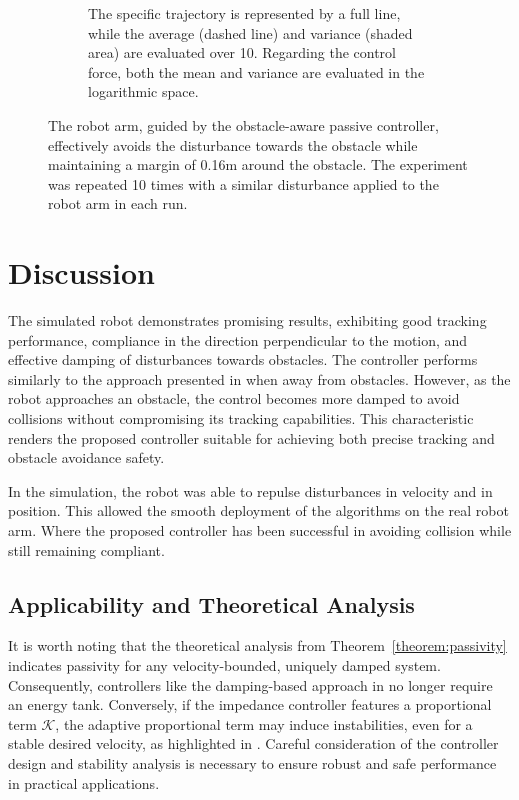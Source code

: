\begin{figure}
\begin{subfigure}{\columnwidth}
      \caption{The specific trajectory is represented by a full line, while the average (dashed line) and variance (shaded area) are evaluated over 10.  Regarding the control force, both the mean and variance are evaluated in the logarithmic space.}
      \label{fig:trajectory_comparison_force_and_distance}
    \end{subfigure}
	\caption{
The robot arm, guided by the obstacle-aware passive controller, effectively avoids the disturbance towards the obstacle while maintaining a margin of 0.16m around the obstacle. The experiment was repeated 10 times with a similar disturbance applied to the robot arm in each run.
 }  
    \label{fig:evaluation_on_robot_arm}
\end{figure}

\section{Discussion}
The simulated robot demonstrates promising results, exhibiting good tracking performance, compliance in the direction perpendicular to the motion, and effective damping of disturbances towards obstacles. The controller performs similarly to the approach presented in \cite{kronander2015passive} when away from obstacles. However, as the robot approaches an obstacle, the control becomes more damped to avoid collisions without compromising its tracking capabilities. This characteristic renders the proposed controller suitable for achieving both precise tracking and obstacle avoidance safety.

In the simulation, the robot was able to repulse disturbances in velocity and in position. This allowed the smooth deployment of the algorithms on the real robot arm. Where the proposed controller has been successful in avoiding collision while still remaining compliant.

\subsection{Applicability and Theoretical Analysis}
It is worth noting that the theoretical analysis from Theorem~\ref{theorem:passivity} indicates passivity for any velocity-bounded, uniquely damped system. Consequently, controllers like the damping-based approach in \cite{kronander2015passive} no longer require an energy tank. Conversely, if the impedance controller features a proportional term $\mathcal{K}$, the adaptive proportional term may induce instabilities, even for a stable desired velocity, as highlighted in \cite{ferraguti2013tank, kronander2016stability}. Careful consideration of the controller design and stability analysis is necessary to ensure robust and safe performance in practical applications.